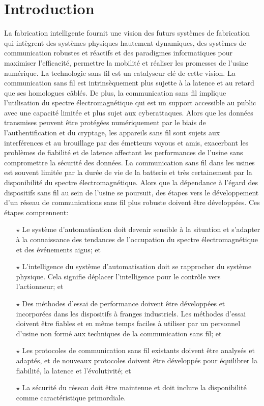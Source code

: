 \documentclass[12pt]{article}
\begin{document}
		\section*{Introduction}
		La fabrication intelligente fournit une vision des futurs systèmes de fabrication qui intègrent des systèmes physiques hautement dynamiques, des systèmes de communication robustes et réactifs et des paradigmes informatiques pour maximiser l'efficacité, permettre la mobilité et réaliser les promesses de l'usine numérique. La technologie sans fil est un catalyseur clé de cette vision. La communication sans fil est intrinsèquement plus sujette à la latence et au retard que ses homologues câblés. De plus, la communication sans fil implique l'utilisation du spectre électromagnétique qui est un support accessible au public avec une capacité limitée et plus sujet aux cyberattaques. Alors que les données transmises peuvent être protégées numériquement par le biais de l'authentification et du cryptage, les appareils sans fil sont sujets aux interférences et au brouillage par des émetteurs voyous et amis, exacerbant les problèmes de fiabilité et de latence affectant les performances de l'usine sans compromettre la sécurité des données. La communication sans fil dans les usines est souvent limitée par la durée de vie de la batterie et très certainement par la disponibilité du spectre électromagnétique. Alors que la dépendance à l'égard des dispositifs sans fil au sein de l'usine se poursuit, des étapes vers le développement d'un réseau de communications sans fil plus robuste doivent être développées. Ces étapes comprennent:
			
		\begin{itemize}
			\item[$\star$] Le système d'automatisation doit devenir sensible à la situation et s'adapter à la connaissance des tendances de l'occupation du spectre électromagnétique et des événements aigus; et
			
			\item[$\star$] L'intelligence du système d'automatisation doit se rapprocher du système physique. Cela signifie déplacer l'intelligence pour le contrôle vers l'actionneur; et
			
			\item[$\star$] Des méthodes d'essai de performance doivent être développées et incorporées dans les dispositifs à franges industriels. Les méthodes d'essai doivent être fiables et en même temps faciles à utiliser par un personnel d'usine non formé aux techniques de la communication sans fil; et
			
			\item[$\star$] Les protocoles de communication sans fil existants doivent être analysés et adaptés, et de nouveaux protocoles doivent être développés pour équilibrer la fiabilité, la latence et l'évolutivité; et
			 
			\item[$\star$] La sécurité du réseau doit être maintenue et doit inclure la disponibilité comme caractéristique primordiale.
		\end{itemize}
		
\end{document}
